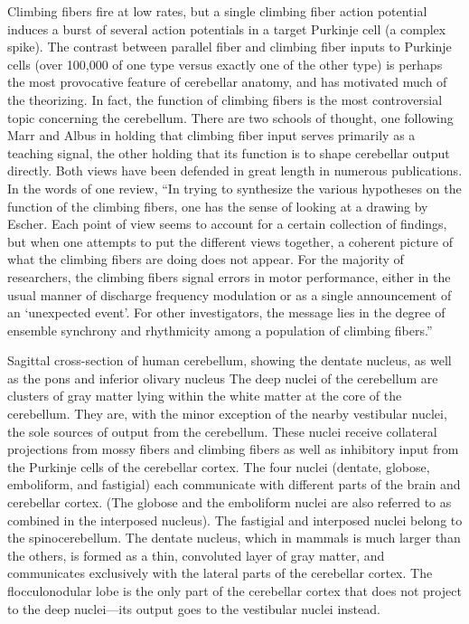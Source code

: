 Climbing fibers fire at low rates, but a single climbing fiber action potential induces a burst of several action potentials in a target Purkinje cell (a complex spike). The contrast between parallel fiber and climbing fiber inputs to Purkinje cells (over 100,000 of one type versus exactly one of the other type) is perhaps the most provocative feature of cerebellar anatomy, and has motivated much of the theorizing. In fact, the function of climbing fibers is the most controversial topic concerning the cerebellum. There are two schools of thought, one following Marr and Albus in holding that climbing fiber input serves primarily as a teaching signal, the other holding that its function is to shape cerebellar output directly. Both views have been defended in great length in numerous publications. In the words of one review, ``In trying to synthesize the various hypotheses on the function of the climbing fibers, one has the sense of looking at a drawing by Escher. Each point of view seems to account for a certain collection of findings, but when one attempts to put the different views together, a coherent picture of what the climbing fibers are doing does not appear. For the majority of researchers, the climbing fibers signal errors in motor performance, either in the usual manner of discharge frequency modulation or as a single announcement of an `unexpected event'. For other investigators, the message lies in the degree of ensemble synchrony and rhythmicity among a population of climbing fibers.''

Sagittal cross-section of human cerebellum, showing the dentate nucleus, as well as the pons and inferior olivary nucleus
The deep nuclei of the cerebellum are clusters of gray matter lying within the white matter at the core of the cerebellum. They are, with the minor exception of the nearby vestibular nuclei, the sole sources of output from the cerebellum. These nuclei receive collateral projections from mossy fibers and climbing fibers as well as inhibitory input from the Purkinje cells of the cerebellar cortex. The four nuclei (dentate, globose, emboliform, and fastigial) each communicate with different parts of the brain and cerebellar cortex. (The globose and the emboliform nuclei are also referred to as combined in the interposed nucleus). The fastigial and interposed nuclei belong to the spinocerebellum. The dentate nucleus, which in mammals is much larger than the others, is formed as a thin, convoluted layer of gray matter, and communicates exclusively with the lateral parts of the cerebellar cortex. The flocculonodular lobe is the only part of the cerebellar cortex that does not project to the deep nuclei---its output goes to the vestibular nuclei instead.

